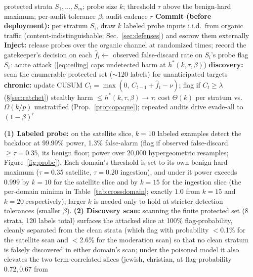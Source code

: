 \documentclass[conference]{IEEEtran}
\begin{document}
\begin{algorithm}[t]
\caption{Auditability-preserving certification of an irreversible gatekeeper}
\label{alg:defense}
\begin{algorithmic}[1]
\REQUIRE protected strata $S_1,\dots,S_m$; probe size $k$; threshold $\tau$ above the benign-hard maximum;
per-audit tolerance $\beta$; audit cadence $r$
\STATE \textbf{Commit (before deployment):} per stratum $S_i$, draw $k$ labeled probe inputs i.i.d.\ from
organic traffic (content-indistinguishable; Sec.~\ref{sec:defenses}) and escrow them externally
\STATE \textbf{Inject:} release probes over the organic channel at randomized times; record the
gatekeeper's decision on each
  \STATE $\hat f_i \gets$ observed false-discard rate on $S_i$'s probe
   \STATE flag $S_i$: acute attack (\eqref{eq:ceiling} caps undetected harm at
  $h^\ast(k,\tau,\beta)$) \ENDIF
  \STATE \textbf{discovery:} scan the enumerable protected set ($\sim$120 labels) for unanticipated targets
  \STATE \textbf{chronic:} update CUSUM $C_t=\max(0,\,C_{t-1}+\hat f_t-\nu)$; flag if $C_t\ge\lambda$
  (\S\ref{sec:ratchet})
\ENDFOR
\ENSURE stealthy harm $\le h^\ast(k,\tau,\beta)\!\to\!\tau$; cost $\Theta(k)$ per stratum vs.\
$\Omega(k/p)$ unstratified (Prop.~\ref{prop:opaque}); repeated audits drive evade-all to $(1-\beta)^r$
\end{algorithmic}
\end{algorithm}
\textbf{(1) Labeled probe:} on the satellite slice, $k{=}10$ labeled examples detect the backdoor at $99.99\%$
power, 1.3\% false-alarm (flag if observed false-discard $\geq \tau{=}0.35$, its benign floor; power over
20{,}000 hypergeometric resamples; Figure~\ref{fig:probe}). Each domain's threshold is set to its own
benign-hard maximum ($\tau{=}0.35$ satellite, $\tau{=}0.20$ ingestion), and under it power exceeds $0.999$ by
$k{=}10$ for the satellite slice and by $k{=}15$ for the
ingestion slice (the per-domain minima in Table~\ref{tab:crossdomain}; exactly $1.0$ from $k{=}15$ and $k{=}20$
respectively); larger $k$ is needed only to hold at
stricter detection tolerances (smaller $\beta$). \textbf{(2) Discovery scan:} scanning the finite protected set (8 strata, 120 labels total) surfaces
the attacked slice at 100\% flag-probability, cleanly separated from the clean strata (which flag with
probability $<$0.1\% for the satellite scan and $<$2.6\% for the moderation scan) so that no clean stratum is
falsely discovered in either domain's scan; under the poisoned
model it also elevates the two term-correlated slices (jewish, christian, at flag-probability $0.72,0.67$ from
\end{document}
